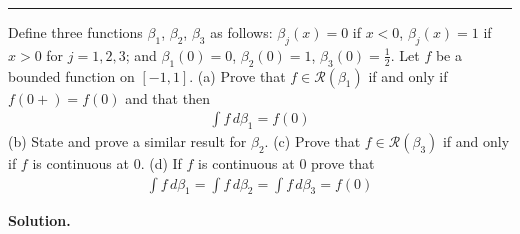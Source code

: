 \documentclass[12pt]{article}
\theoremstyle{definition}
\begin{document}
\bigskip\noindent\hrule\bigskip

Define three functions $\beta_1$, $\beta_2$, $\beta_3$ as follows: $\beta_j(x)=0$ if $x<0$, $\beta_j(x)=1$ if $x>0$ for $j=1,2,3$; and $\beta_1(0)=0$, $\beta_2(0)=1$, $\beta_3(0)=\tfrac{1}{2}$. Let $f$ be a bounded function on $[-1,1]$.
(a) Prove that $f\in\mathcal{R}(\beta_1)$ if and only if $f(0+)=f(0)$ and that then
\begin{align*}
\int f\,d\beta_1=f(0)
\end{align*}
(b) State and prove a similar result for $\beta_2$.
(c) Prove that $f\in\mathcal{R}(\beta_3)$ if and only if $f$ is continuous at $0$.
(d) If $f$ is continuous at $0$ prove that
\begin{align*}
\int f\,d\beta_1=\int f\,d\beta_2=\int f\,d\beta_3=f(0)
\end{align*}

\smallskip
\noindent\textbf{Solution.}\quad
\end{document}
